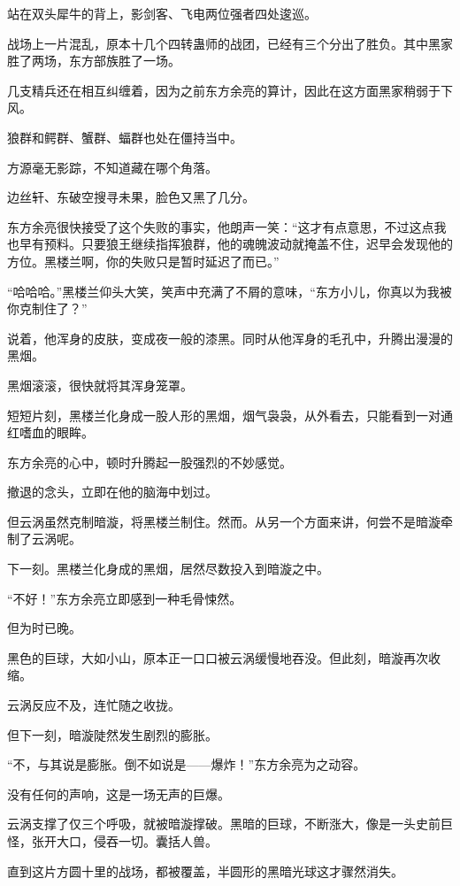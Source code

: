 
\begin{this_body}

站在双头犀牛的背上，影剑客、飞电两位强者四处逡巡。

战场上一片混乱，原本十几个四转蛊师的战团，已经有三个分出了胜负。其中黑家胜了两场，东方部族胜了一场。

几支精兵还在相互纠缠着，因为之前东方余亮的算计，因此在这方面黑家稍弱于下风。

狼群和鳄群、蟹群、蝠群也处在僵持当中。

方源毫无影踪，不知道藏在哪个角落。

边丝轩、东破空搜寻未果，脸色又黑了几分。

东方余亮很快接受了这个失败的事实，他朗声一笑：“这才有点意思，不过这点我也早有预料。只要狼王继续指挥狼群，他的魂魄波动就掩盖不住，迟早会发现他的方位。黑楼兰啊，你的失败只是暂时延迟了而已。”

“哈哈哈。”黑楼兰仰头大笑，笑声中充满了不屑的意味，“东方小儿，你真以为我被你克制住了？”

说着，他浑身的皮肤，变成夜一般的漆黑。同时从他浑身的毛孔中，升腾出漫漫的黑烟。

黑烟滚滚，很快就将其浑身笼罩。

短短片刻，黑楼兰化身成一股人形的黑烟，烟气袅袅，从外看去，只能看到一对通红嗜血的眼眸。

东方余亮的心中，顿时升腾起一股强烈的不妙感觉。

撤退的念头，立即在他的脑海中划过。

但云涡虽然克制暗漩，将黑楼兰制住。然而。从另一个方面来讲，何尝不是暗漩牵制了云涡呢。

下一刻。黑楼兰化身成的黑烟，居然尽数投入到暗漩之中。

“不好！”东方余亮立即感到一种毛骨悚然。

但为时已晚。

黑色的巨球，大如小山，原本正一口口被云涡缓慢地吞没。但此刻，暗漩再次收缩。

云涡反应不及，连忙随之收拢。

但下一刻，暗漩陡然发生剧烈的膨胀。

“不，与其说是膨胀。倒不如说是——爆炸！”东方余亮为之动容。

没有任何的声响，这是一场无声的巨爆。

云涡支撑了仅三个呼吸，就被暗漩撑破。黑暗的巨球，不断涨大，像是一头史前巨怪，张开大口，侵吞一切。囊括人兽。

直到这片方圆十里的战场，都被覆盖，半圆形的黑暗光球这才骤然消失。


\end{this_body}
